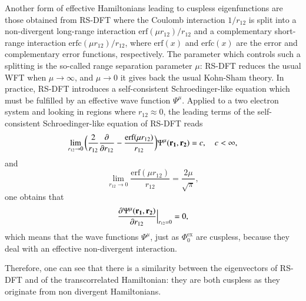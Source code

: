 \documentclass[aip,jcp,reprint,noshowkeys,superscriptaddress]{revtex4-1}
\newcommand{\deriv}[3]{\frac{\partial^{#3} #1}{\partial {#2}^{#3}}}
\newcommand{\bd}[1]{{\bf {#1}}}
\newcommand{\phiex}[0]{\Phi^{\text{ex}}_0}
\begin{document}
Another form of effective Hamiltonians leading to cuspless eigenfunctions are those obtained from RS-DFT 
where the Coulomb interaction $1/r_{12}$ is split into a non-divergent long-range interaction $\text{erf}(\mu r_{12})/r_{12}$ and a complementary short-range interaction $\text{erfc}(\mu r_{12})/r_{12}$, where $\text{erf}(x)$ and $\text{erfc}(x)$ are the error and complementary error functions, respectively. 
The parameter which controls such a splitting is the so-called range separation parameter $\mu$:  RS-DFT reduces the usual WFT when $\mu \rightarrow \infty$, and $\mu \rightarrow 0$ it gives back the usual Kohn-Sham theory.  
In practice, RS-DFT introduces a self-consistent Schroedinger-like equation which must be fulfilled by an effective wave function  $\Psi^\mu$.
Applied to a two electron system and looking in regions where $r_{12}\approx 0$, the leading terms of the self-consistent Schroedinger-like equation of RS-DFT reads 
\begin{equation}
 \label{eq:cusp_psi_mu_0}
 \lim_{r_{12}\rightarrow 0}\bigg( \frac{2}{r_{12}} \deriv{}{r_{12}}{} -\frac{\text{erf}(\mu r_{12})}{r_{12}}\bigg) \Psi^\mu(\bd{r_1},\bd{r_2})  = c,\quad c<\infty,  
\end{equation}
and 
\begin{equation}
 \lim_{r_{12} \rightarrow 0} \frac{\text{erf}(\mu r_{12})}{r_{12}} = \frac{2 \mu}{\sqrt{\pi}} , 
\end{equation}
one obtains that 
\begin{equation}
 \label{eq:cusp_psi_mu_1}
 \deriv{\Psi^\mu(\bd{r_1},\bd{r_2})}{r_{12}}{}\Bigr|_{r_{12}=0} = 0, 
\end{equation}
which means that the wave functions $\Psi^\mu$, just as $\phiex$ are cuspless, because they deal with an effective non-divergent interaction. 

Therefore, one can see that there is a similarity between the eigenvectors of RS-DFT and of the transcorrelated Hamiltonian: they are both cuspless as they originate from non divergent Hamiltonians. 
\end{document}
